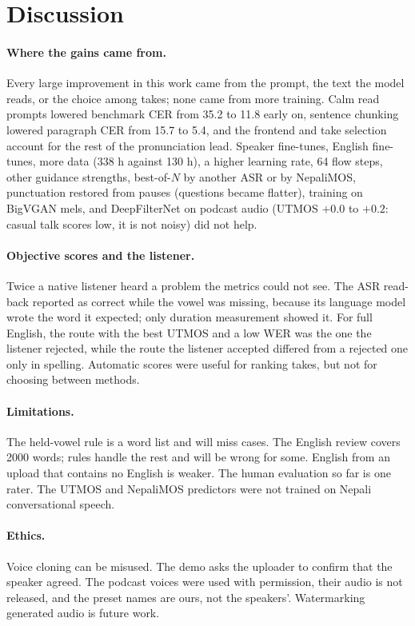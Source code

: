 \section{Discussion}

\paragraph{Where the gains came from.} Every large improvement in this work came from the prompt, the text the model reads, or the choice among takes; none came from more training. Calm read prompts lowered benchmark CER from 35.2 to 11.8 early on, sentence chunking lowered paragraph CER from 15.7 to 5.4, and the frontend and take selection account for the rest of the pronunciation lead. Speaker fine-tunes, English fine-tunes, more data (338 h against 130 h), a higher learning rate, 64 flow steps, other guidance strengths, best-of-$N$ by another ASR or by NepaliMOS, punctuation restored from pauses (questions became flatter), training on BigVGAN mels, and DeepFilterNet on podcast audio (UTMOS $+0.0$ to $+0.2$: casual talk scores low, it is not noisy) did not help.

\paragraph{Objective scores and the listener.} Twice a native listener heard a problem the metrics could not see. The ASR read-back reported  as correct while the vowel was missing, because its language model wrote the word it expected; only duration measurement showed it. For full English, the route with the best UTMOS and a low WER was the one the listener rejected, while the route the listener accepted differed from a rejected one only in spelling. Automatic scores were useful for ranking takes, but not for choosing between methods.

\paragraph{Limitations.} The held-vowel rule is a word list and will miss cases. The English review covers 2000 words; rules handle the rest and will be wrong for some. English from an upload that contains no English is weaker. The human evaluation so far is one rater. The UTMOS and NepaliMOS predictors were not trained on Nepali conversational speech.

\paragraph{Ethics.} Voice cloning can be misused. The demo asks the uploader to confirm that the speaker agreed. The podcast voices were used with permission, their audio is not released, and the preset names are ours, not the speakers'. Watermarking generated audio is future work.

